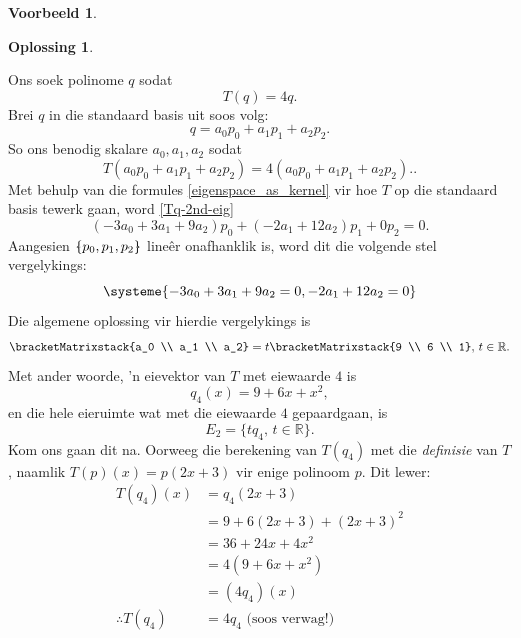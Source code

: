 \documentclass[a4paper,11pt]{book}
\theoremstyle{definition}
\newtheorem{example_environment}{Voorbeeld}[chapter]
\newtheorem*{solution}{Oplossing}
\newcommand{\cmatrix}[1]{\bracketMatrixstack{#1}}
\newenvironment{example}
	{
		\begin{oframed}
		\begin{example_environment}
	}
	{
		\end{example_environment}
		\end{oframed}
	}
\newcommand{\bmark}{\raisebox{.53ex}{\rule{.2em}{.1ex}}}
\newcommand{\bopen}{{\protect\ooalign{\{\cr\hfil\bmark\hfil\cr}}}
\newcommand{\bclose}{{\protect\ooalign{\}\cr\hfil\bmark\hfil\cr}}}
\begin{document}
\begin{example}
\begin{solution}
\begin{itemize}
				Ons soek polinome $q$ sodat
				\[
					T(q) = 4q.
				\]
				Brei $q$ in die standaard basis uit soos volg: 
				\[
					q = a_0 p_0 + a_1 p_1 + a_2 p_2.
				\] 
				So ons benodig skalare $a_0, a_1, a_2$ sodat
				\begin{equation}
					T(a_0 p_0 + a_1 p_1 + a_2 p_2) = 4 (a_0 p_0 + a_1 p_1 +
					a_2 p_2). \label{Tq-2nd-eig}.
				\end{equation}
				Met behulp van die formules \eqref{eigenspace_as_kernel}
				vir hoe $T$ op die standaard basis tewerk gaan, word
				\eqref{Tq-2nd-eig}
				\[
					(-3a_0 + 3a_1 + 9a_2) p_0 + (-2 a_1 + 12 a_2) p_1 + 0
					p_2 = 0.
				\]
				Aangesien $\bopen p_0, p_1, p_2 \bclose$ line{\^e}r
				onafhanklik is, word dit die volgende stel vergelykings:
				\begin{equation} \label{eqns-eig-T-internal}
					\systeme{-3a_0 + 3a_1 + 9a_2 = 0, -2a_1 + 12 a_2 = 0}
				\end{equation}
				Die algemene oplossing vir hierdie vergelykings is
				\[
					\cmatrix{a_0 \\ a_1 \\ a_2} = t \cmatrix{9 \\ 6 \\ 1},
					\, t \in \mathbb{R}.
				\]
				Met ander woorde, 'n eievektor van $T$ met eiewaarde $4$ is
				\[
					q_4(x) = 9 + 6x + x^2,
				\]
				en die hele eieruimte wat met die eiewaarde $4$
				gepaardgaan, is 
				\[
					E_2 = \{ t q_4, \, t \in \mathbb{R} \}.
				\]
				Kom ons gaan dit na. Oorweeg die berekening van $T(q_4)$
				met die \emph{definisie} van $T$, naamlik $T(p)(x) = p(2x +
				3)$ vir enige polinoom $p$. Dit lewer:
				\begin{align*}
					T(q_4)(x) &= q_4(2x+3) \\
					&= 9 + 6(2x + 3) + (2x+3)^2 \\
					&= 36 + 24x + 4x^2 \\
					&= 4(9 + 6x + x^2) \\
					&= (4q_4)(x) \\
					\therefore T(q_4) &= 4q_4 \mbox{ (soos verwag!)}
				\end{align*}

		\end{itemize}

	\end{solution}
\end{example}
\end{document}
